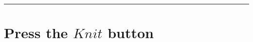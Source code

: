 \documentclass[]{book}
\theoremstyle{definition}
\theoremstyle{definition}
\theoremstyle{definition}
\theoremstyle{remark}
\begin{document}
\begin{center}\rule{0.5\linewidth}{\linethickness}\end{center}

\section{\texorpdfstring{Press the \(Knit\)
button}{Press the Knit button}}\label{press-the-knit-button}


\end{document}
